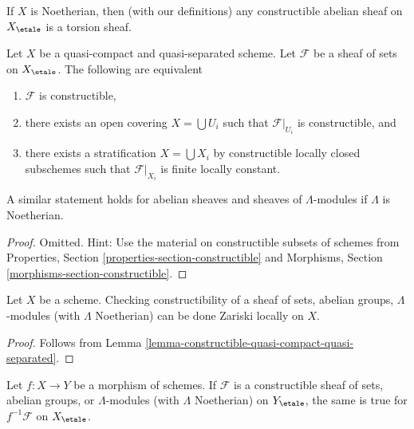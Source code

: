 \begin{remark}
\label{remark-noetherian-constructible-torsion}
If $X$ is Noetherian, then (with our definitions)
any constructible abelian sheaf on $X_\etale$ is a torsion sheaf.
\end{remark}

\begin{lemma}
\label{lemma-constructible-quasi-compact-quasi-separated}
Let $X$ be a quasi-compact and quasi-separated scheme. Let $\mathcal{F}$
be a sheaf of sets on $X_\etale$. The following are equivalent
\begin{enumerate}
\item $\mathcal{F}$ is constructible,
\item there exists an open covering $X = \bigcup U_i$ such that
$\mathcal{F}|_{U_i}$ is constructible, and
\item there exists a stratification $X = \bigcup X_i$ by constructible
locally closed subschemes such that $\mathcal{F}|_{X_i}$ is finite
locally constant.
\end{enumerate}
A similar statement holds for abelian sheaves and sheaves of
$\Lambda$-modules if $\Lambda$ is Noetherian.
\end{lemma}

\begin{proof}
Omitted. Hint: Use the material on constructible subsets of schemes
from Properties, Section \ref{properties-section-constructible} and
Morphisms, Section \ref{morphisms-section-constructible}.
\end{proof}

\begin{lemma}
\label{lemma-constructible-local}
Let $X$ be a scheme. Checking constructibility of a sheaf
of sets, abelian groups, $\Lambda$-modules (with $\Lambda$ Noetherian)
can be done Zariski locally on $X$.
\end{lemma}

\begin{proof}
Follows from Lemma \ref{lemma-constructible-quasi-compact-quasi-separated}.
\end{proof}

\begin{lemma}
\label{lemma-pullback-constructible}
Let $f : X \to Y$ be a morphism of schemes. If $\mathcal{F}$ is a
constructible sheaf of sets, abelian groups, or $\Lambda$-modules
(with $\Lambda$ Noetherian) on $Y_\etale$, the same
is true for $f^{-1}\mathcal{F}$ on $X_\etale$.
\end{lemma}

